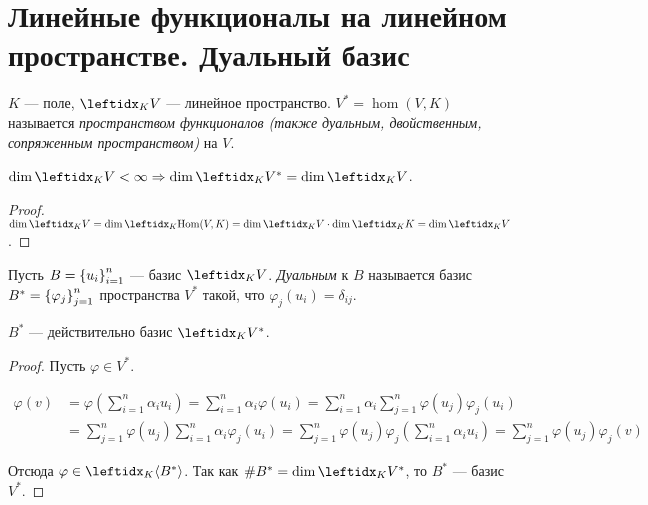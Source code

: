 \section{Линейные функционалы на линейном пространстве. Дуальный базис}

\begin{defn}
    $K$ --- поле, $\lsub{K}{V}$ --- линейное пространство. $V^* = \hom(V, K)$ называется \textit{пространством функционалов (также дуальным, двойственным, сопряженным пространством)} на $V$.
\end{defn}

\begin{thm}
    $\dim \lsub{K}{V} < \infty \Rightarrow \dim \lsub{K}{V^*} = \dim \lsub{K}{V}$.
\end{thm}

\begin{proof}
    $\dim \lsub{K}{V} = \dim \lsub{K}{\hom(V, K)} = \dim \lsub{K}{V} \cdot \dim \lsub{K}{K} = \dim \lsub{K}{V}$.
\end{proof}

\begin{defn}
    Пусть $B = \left\{u_i\right\}_{i=1}^{n}$ --- базис $\lsub{K}{V}$. \textit{Дуальным} к $B$ называется базис $B^* = \left\{\varphi_j\right\}_{j=1}^{n}$ пространства $V^*$ такой, что $\varphi_j(u_i) = \delta_{ij}$.
\end{defn}

\begin{thm}
    $B^*$ --- действительно базис $\lsub{K}{V^*}$.
\end{thm}

\begin{proof}
    Пусть $\varphi \in V^*$.
    
    \begin{align*}
        \varphi(v) &= \varphi\left(\sum_{i=1}^n \alpha_i u_i\right) = \sum_{i=1}^n \alpha_i \varphi(u_i) = \sum_{i=1}^n \alpha_i \sum_{j=1}^n \varphi(u_j) \varphi_j(u_i) \\
        &= \sum_{j=1}^n \varphi(u_j) \sum_{i=1}^n \alpha_i \varphi_j(u_i) = \sum_{j=1}^n \varphi(u_j) \varphi_j \left(\sum_{i=1}^n \alpha_i u_i \right) = \sum_{j=1}^n \varphi(u_j) \varphi_j(v)
    \end{align*}
    
    Отсюда $\varphi \in \gen{K}{B^*}$. Так как $\#B^* = \dim \lsub{K}{V^*}$, то $B^*$ --- базис $V^*$.
\end{proof}
